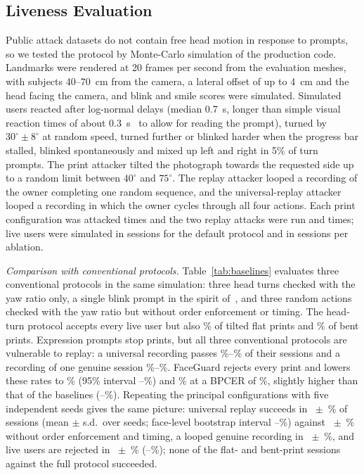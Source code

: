 \documentclass[journal]{IEEEtran}
\newcommand{\sys}{FaceGuard}
\begin{document}
\subsection{Liveness Evaluation}\label{sec:liveres}
Public attack datasets do not contain free head motion in response to prompts, so we tested the protocol by Monte-Carlo simulation of the production code. Landmarks were rendered at 20 frames per second from the evaluation meshes, with subjects 40--70~cm from the camera, a lateral offset of up to 4~cm and the head facing the camera, and blink and smile scores were simulated. Simulated users reacted after log-normal delays (median 0.7~s, longer than simple visual reaction times of about 0.3~s~\cite{tatsuno2016reaction} to allow for reading the prompt), turned by $30^\circ\pm8^\circ$ at random speed, turned further or blinked harder when the progress bar stalled, blinked spontaneously and mixed up left and right in 5\% of turn prompts. The print attacker tilted the photograph towards the requested side up to a random limit between $40^\circ$ and $75^\circ$. The replay attacker looped a recording of the owner completing one random sequence, and the universal-replay attacker looped a recording in which the owner cycles through all four actions. Each print configuration was attacked \attPrintN{} times and the two replay attacks were run \attReplayN{} and \attUniversalN{} times; live users were simulated in \livN{} sessions for the default protocol and in \livNAbl{} sessions per ablation.

\emph{Comparison with conventional protocols.} Table~\ref{tab:baselines} evaluates three conventional protocols in the same simulation: three head turns checked with the yaw ratio only, a single blink prompt in the spirit of~\cite{pan2007eyeblink}, and three random actions checked with the yaw ratio but without order enforcement or timing. The head-turn protocol accepts every live user but also \lbYawFlat\% of tilted flat prints and \lbYawBent\% of bent prints. Expression prompts stop prints, but all three conventional protocols are vulnerable to replay: a universal recording passes \lbUniMin\%--\lbUniMax\% of their sessions and a recording of one genuine session \lbRepMin\%--\lbRepMax\%. \sys{} rejects every print and lowers these rates to \lbFgUni\% (95\% interval \attUniversalFullLo--\attUniversalFullHi\%) and \lbFgReplay\% at a BPCER of \lbFgLive\%, slightly higher than that of the baselines (\lbYawLive--\lbBlinkLive\%). Repeating the principal configurations with five independent seeds gives the same picture: universal replay succeeds in \msUniMean{}~$\pm$~\msUniSd\% of sessions (mean $\pm$ s.d.\ over seeds; face-level bootstrap interval \msUniLo--\msUniHi\%) against \msUniNeitherMean{}~$\pm$~\msUniNeitherSd\% without order enforcement and timing, a looped genuine recording in \msRepMean{}~$\pm$~\msRepSd\%, and live users are rejected in \msLiveMean{}~$\pm$~\msLiveSd\% (\msLiveLo--\msLiveHi\%); none of the \msPrintZero{} flat- and bent-print sessions against the full protocol succeeded.
\end{document}

